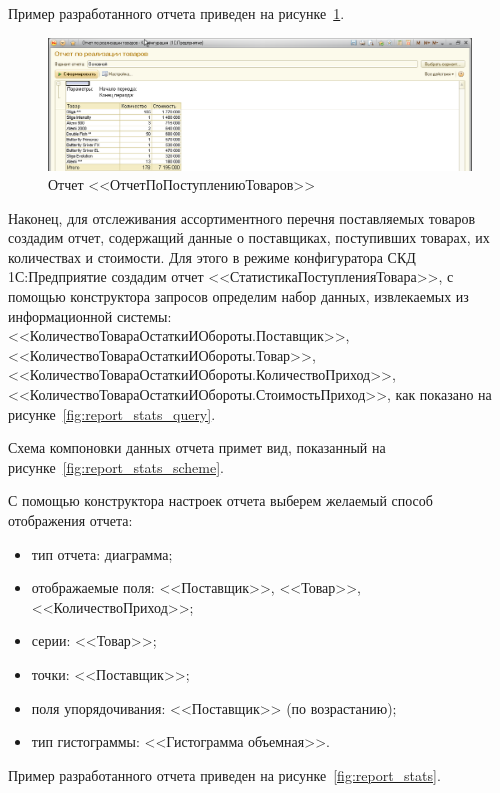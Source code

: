 Пример разработанного отчета приведен на рисунке~\ref{fig:report_output}.

\begin{figure}[h!]
  \centering
  \includegraphics[width=150mm]{pic/report_output}
  \caption{Отчет <<ОтчетПоПоступлениюТоваров>>}
  \label{fig:report_output}
\end{figure}

Наконец, для отслеживания ассортиментного перечня поставляемых товаров
создадим отчет, содержащий данные о поставщиках,
поступивших товарах, их количествах и стоимости.
Для этого в режиме конфигуратора СКД 1С:Предприятие создадим отчет
<<СтатистикаПоступленияТовара>>, с помощью конструктора запросов
определим набор данных, извлекаемых из информационной системы:
<<КоличествоТовараОстаткиИОбороты.Поставщик>>,
<<КоличествоТовараОстаткиИОбороты.Товар>>,
<<КоличествоТовараОстаткиИОбороты.КоличествоПриход>>,
<<КоличествоТовараОстаткиИОбороты.СтоимостьПриход>>,
как показано на рисунке~\ref{fig:report_stats_query}.

Схема компоновки данных отчета примет вид,
показанный на рисунке~\ref{fig:report_stats_scheme}.

С помощью конструктора настроек отчета выберем желаемый способ отображения
отчета:
\begin{itemize}
\item тип отчета: диаграмма;
\item отображаемые поля: <<Поставщик>>,
  <<Товар>>, <<КоличествоПриход>>;
\item серии: <<Товар>>;
\item точки: <<Поставщик>>;
\item поля упорядочивания:
  <<Поставщик>> (по возрастанию);
\item тип гистограммы:
  <<Гистограмма объемная>>.
\end{itemize}

Пример разработанного отчета приведен на рисунке~\ref{fig:report_stats}.

